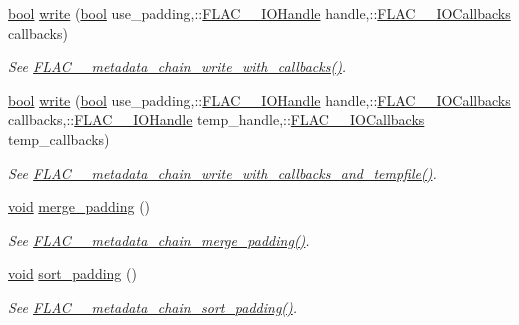 \begin{DoxyCompactItemize}
\hyperlink{mac_2config_2i386_2lib-src_2libsoxr_2soxr-config_8h_abb452686968e48b67397da5f97445f5b}{bool} \hyperlink{class_f_l_a_c_1_1_metadata_1_1_chain_a337e570e1b8fa93f7b586533bcf3eb1a}{write} (\hyperlink{mac_2config_2i386_2lib-src_2libsoxr_2soxr-config_8h_abb452686968e48b67397da5f97445f5b}{bool} use\+\_\+padding,\+::\hyperlink{group__flac__callbacks_ga4c329c3168dee6e352384c5e9306260d}{F\+L\+A\+C\+\_\+\+\_\+\+I\+O\+Handle} handle,\+::\hyperlink{struct_f_l_a_c_____i_o_callbacks}{F\+L\+A\+C\+\_\+\+\_\+\+I\+O\+Callbacks} callbacks)
\begin{DoxyCompactList}\small\item\em See \hyperlink{group__flac__metadata__level2_ga6bf7552940ec2242718d1ab164b89e03}{F\+L\+A\+C\+\_\+\+\_\+metadata\+\_\+chain\+\_\+write\+\_\+with\+\_\+callbacks()}. \end{DoxyCompactList}\item 
\hyperlink{mac_2config_2i386_2lib-src_2libsoxr_2soxr-config_8h_abb452686968e48b67397da5f97445f5b}{bool} \hyperlink{class_f_l_a_c_1_1_metadata_1_1_chain_a4a2826329e53dda6494b41506dd39de3}{write} (\hyperlink{mac_2config_2i386_2lib-src_2libsoxr_2soxr-config_8h_abb452686968e48b67397da5f97445f5b}{bool} use\+\_\+padding,\+::\hyperlink{group__flac__callbacks_ga4c329c3168dee6e352384c5e9306260d}{F\+L\+A\+C\+\_\+\+\_\+\+I\+O\+Handle} handle,\+::\hyperlink{struct_f_l_a_c_____i_o_callbacks}{F\+L\+A\+C\+\_\+\+\_\+\+I\+O\+Callbacks} callbacks,\+::\hyperlink{group__flac__callbacks_ga4c329c3168dee6e352384c5e9306260d}{F\+L\+A\+C\+\_\+\+\_\+\+I\+O\+Handle} temp\+\_\+handle,\+::\hyperlink{struct_f_l_a_c_____i_o_callbacks}{F\+L\+A\+C\+\_\+\+\_\+\+I\+O\+Callbacks} temp\+\_\+callbacks)
\begin{DoxyCompactList}\small\item\em See \hyperlink{group__flac__metadata__level2_ga371beab0d09d5248272bcb8d57de94f3}{F\+L\+A\+C\+\_\+\+\_\+metadata\+\_\+chain\+\_\+write\+\_\+with\+\_\+callbacks\+\_\+and\+\_\+tempfile()}. \end{DoxyCompactList}\item 
\hyperlink{sound_8c_ae35f5844602719cf66324f4de2a658b3}{void} \hyperlink{class_f_l_a_c_1_1_metadata_1_1_chain_aef51a0414284f468a2d73c07b540641d}{merge\+\_\+padding} ()
\begin{DoxyCompactList}\small\item\em See \hyperlink{group__flac__metadata__level2_gab24934bc1f0e054c631a22c9b9221f3e}{F\+L\+A\+C\+\_\+\+\_\+metadata\+\_\+chain\+\_\+merge\+\_\+padding()}. \end{DoxyCompactList}\item 
\hyperlink{sound_8c_ae35f5844602719cf66324f4de2a658b3}{void} \hyperlink{class_f_l_a_c_1_1_metadata_1_1_chain_a779eaac12da7e7edac67089053e5907f}{sort\+\_\+padding} ()
\begin{DoxyCompactList}\small\item\em See \hyperlink{group__flac__metadata__level2_gaa14304da1c8e706808cfafa5cbbf575b}{F\+L\+A\+C\+\_\+\+\_\+metadata\+\_\+chain\+\_\+sort\+\_\+padding()}. \end{DoxyCompactList}\end{DoxyCompactItemize}
